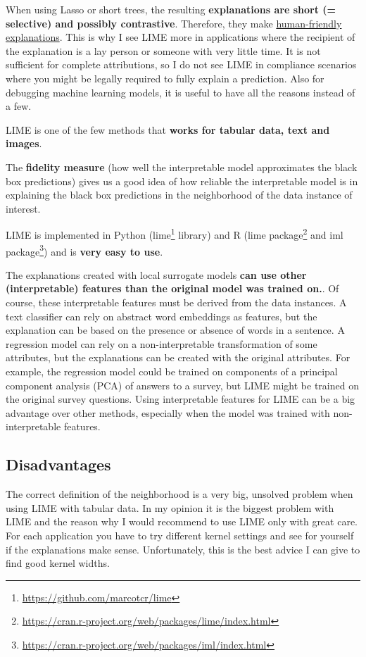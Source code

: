 \documentclass[
  10pt,
]{scrbook}
\renewcommand{\href}[2]{#2\footnote{\url{#1}}}
\begin{document}
When using Lasso or short trees, the resulting \textbf{explanations are short (= selective) and possibly contrastive}.
Therefore, they make \protect\hyperlink{explanation}{human-friendly explanations}.
This is why I see LIME more in applications where the recipient of the explanation is a lay person or someone with very little time.
It is not sufficient for complete attributions, so I do not see LIME in compliance scenarios where you might be legally required to fully explain a prediction.
Also for debugging machine learning models, it is useful to have all the reasons instead of a few.

LIME is one of the few methods that \textbf{works for tabular data, text and images}.

The \textbf{fidelity measure} (how well the interpretable model approximates the black box predictions) gives us a good idea of how reliable the interpretable model is in explaining the black box predictions in the neighborhood of the data instance of interest.

LIME is implemented in Python (\href{https://github.com/marcotcr/lime}{lime} library) and R (\href{https://cran.r-project.org/web/packages/lime/index.html}{lime package} and \href{https://cran.r-project.org/web/packages/iml/index.html}{iml package}) and is \textbf{very easy to use}.

The explanations created with local surrogate models \textbf{can use other (interpretable) features than the original model was trained on.}.
Of course, these interpretable features must be derived from the data instances.
A text classifier can rely on abstract word embeddings as features, but the explanation can be based on the presence or absence of words in a sentence.
A regression model can rely on a non-interpretable transformation of some attributes, but the explanations can be created with the original attributes.
For example, the regression model could be trained on components of a principal component analysis (PCA) of answers to a survey, but LIME might be trained on the original survey questions.
Using interpretable features for LIME can be a big advantage over other methods, especially when the model was trained with non-interpretable features.

\hypertarget{disadvantages-13}{%
\subsection{Disadvantages}\label{disadvantages-13}}

The correct definition of the neighborhood is a very big, unsolved problem when using LIME with tabular data.
In my opinion it is the biggest problem with LIME and the reason why I would recommend to use LIME only with great care.
For each application you have to try different kernel settings and see for yourself if the explanations make sense.
Unfortunately, this is the best advice I can give to find good kernel widths.
\end{document}
